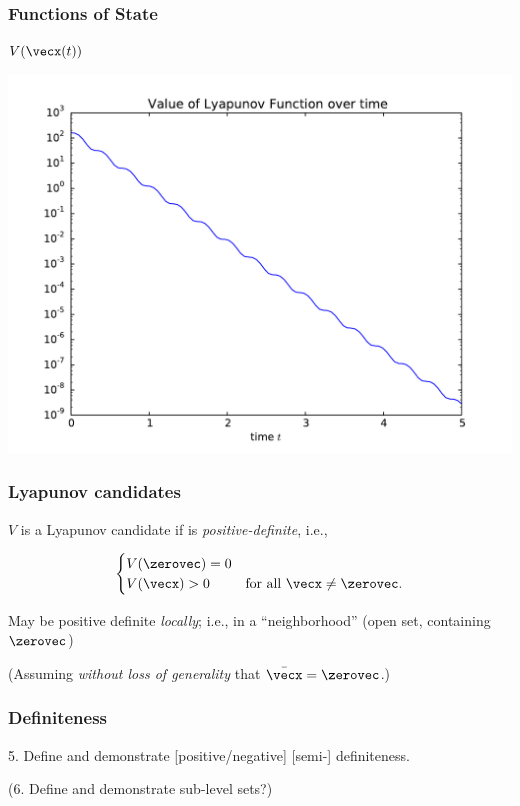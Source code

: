 \documentclass[12pt]{beamer}
\begin{document}
\begin{frame}
\frametitle{Functions of State}

\centering
$V(\vecx(t))$

\includegraphics[width=.8\linewidth]{pic/smd_Vt}

\end{frame}







\begin{frame}
\frametitle{Lyapunov candidates}

\begin{itemize}


\vitem
$V$ is a Lyapunov candidate if is \emph{positive-definite}, i.e.,

\[
\begin{cases}
	V(\zerovec) = 0 &\\
	V(\vecx) > 0 & \text{for all $\vecx \neq \zerovec$}.
\end{cases}
\]

\vitem
May be positive definite \emph{locally}; i.e., in a ``neighborhood''
(open set, containing $\zerovec$)

\vitem
(Assuming \emph{without loss of generality} that $\bar{\vecx} = \zerovec$.)

\end{itemize}
\vfill\null
\end{frame}




\begin{frame}
\frametitle{Definiteness}

5. Define and demonstrate [positive/negative] [semi-] definiteness.

(6. Define and demonstrate sub-level sets?)

\end{frame}
\end{document}
